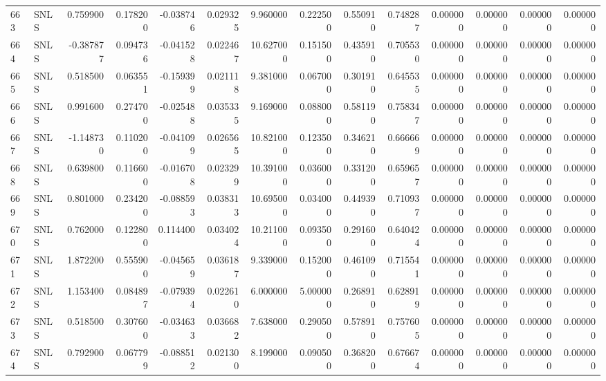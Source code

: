 \begin{tabular}{llrrrrrrrrrrrr}
663 &   SNLS &  0.759900 &      0.178200 & -0.038746 &    0.029325 &   9.960000 &      0.222500 &   0.550910 &  0.748287 &  0.000000 &   0.000000 &     0.000000 &     0.000000 \\
664 &   SNLS & -0.387877 &      0.094736 & -0.041528 &    0.022467 &  10.627000 &      0.151500 &   0.435910 &  0.705530 &  0.000000 &   0.000000 &     0.000000 &     0.000000 \\
665 &   SNLS &  0.518500 &      0.063551 & -0.159399 &    0.021118 &   9.381000 &      0.067000 &   0.301910 &  0.645535 &  0.000000 &   0.000000 &     0.000000 &     0.000000 \\
666 &   SNLS &  0.991600 &      0.274700 & -0.025488 &    0.035335 &   9.169000 &      0.088000 &   0.581190 &  0.758347 &  0.000000 &   0.000000 &     0.000000 &     0.000000 \\
667 &   SNLS & -1.148730 &      0.110200 & -0.041099 &    0.026565 &  10.821000 &      0.123500 &   0.346210 &  0.666669 &  0.000000 &   0.000000 &     0.000000 &     0.000000 \\
668 &   SNLS &  0.639800 &      0.116600 & -0.016708 &    0.023299 &  10.391000 &      0.036000 &   0.331200 &  0.659657 &  0.000000 &   0.000000 &     0.000000 &     0.000000 \\
669 &   SNLS &  0.801000 &      0.234200 & -0.088593 &    0.038313 &  10.695000 &      0.034000 &   0.449390 &  0.710937 &  0.000000 &   0.000000 &     0.000000 &     0.000000 \\
670 &   SNLS &  0.762000 &      0.122800 &  0.114400 &    0.034024 &  10.211000 &      0.093500 &   0.291600 &  0.640424 &  0.000000 &   0.000000 &     0.000000 &     0.000000 \\
671 &   SNLS &  1.872200 &      0.555900 & -0.045659 &    0.036187 &   9.339000 &      0.152000 &   0.461090 &  0.715541 &  0.000000 &   0.000000 &     0.000000 &     0.000000 \\
672 &   SNLS &  1.153400 &      0.084897 & -0.079394 &    0.022610 &   6.000000 &      5.000000 &   0.268910 &  0.628919 &  0.000000 &   0.000000 &     0.000000 &     0.000000 \\
673 &   SNLS &  0.518500 &      0.307600 & -0.034633 &    0.036682 &   7.638000 &      0.290500 &   0.578910 &  0.757605 &  0.000000 &   0.000000 &     0.000000 &     0.000000 \\
674 &   SNLS &  0.792900 &      0.067799 & -0.088512 &    0.021300 &   8.199000 &      0.090500 &   0.368200 &  0.676674 &  0.000000 &   0.000000 &     0.000000 &     0.000000 \\

\end{tabular}
